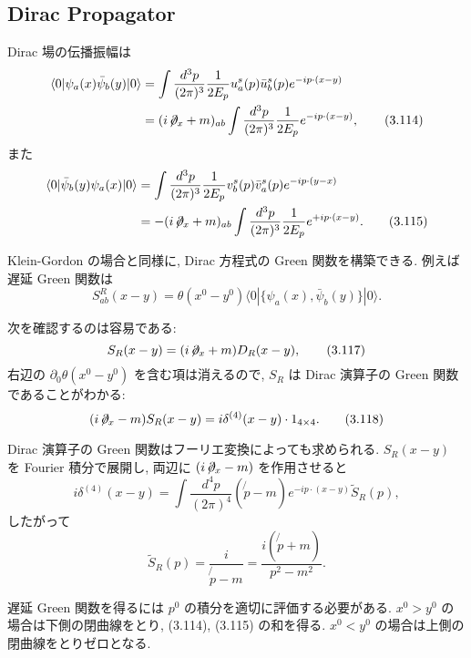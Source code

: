 \documentclass[a4paper,12pt]{article}
\begin{document}
\subsection*{Dirac Propagator}

Dirac 場の伝播振幅は
\begin{align}
\langle 0|\psi_a(x)\bar{\psi}_b(y)|0\rangle
&= \int \frac{d^3p}{(2\pi)^3}\frac{1}{2E_p} u_a^s(p)\bar{u}_b^s(p) e^{-ip\cdot(x-y)} \\
&= (i\!\not\!\partial_x+m)_{ab} \int \frac{d^3p}{(2\pi)^3}\frac{1}{2E_p} e^{-ip\cdot(x-y)} ,
\tag{3.114}
\end{align}
また
\begin{align}
\langle 0|\bar{\psi}_b(y)\psi_a(x)|0\rangle
&= \int \frac{d^3p}{(2\pi)^3}\frac{1}{2E_p} v_b^s(p)\bar{v}_a^s(p) e^{-ip\cdot(y-x)} \\
&= -(i\!\not\!\partial_x+m)_{ab} \int \frac{d^3p}{(2\pi)^3}\frac{1}{2E_p} e^{+ip\cdot(x-y)} .
\tag{3.115}
\end{align}

Klein-Gordon の場合と同様に, Dirac 方程式の Green 関数を構築できる.  
例えば遅延 Green 関数は
\begin{equation}
S^R_{ab}(x-y) = \theta(x^0-y^0)\langle 0|\{\psi_a(x), \bar{\psi}_b(y)\}|0\rangle .
\tag{3.116}
\end{equation}

次を確認するのは容易である:
\begin{equation}
S_R(x-y) = (i\!\not\!\partial_x + m) D_R(x-y),
\tag{3.117}
\end{equation}
右辺の $\partial_0 \theta(x^0-y^0)$ を含む項は消えるので, $S_R$ は Dirac 演算子の Green 関数であることがわかる:
\begin{equation}
(i\!\not\!\partial_x - m) S_R(x-y) = i \delta^{(4)}(x-y)\cdot 1_{4\times4}.
\tag{3.118}
\end{equation}

Dirac 演算子の Green 関数はフーリエ変換によっても求められる.  
$S_R(x-y)$ を Fourier 積分で展開し, 両辺に $(i\!\not\!\partial_x - m)$ を作用させると
\begin{equation}
i\delta^{(4)}(x-y) = \int \frac{d^4p}{(2\pi)^4} (\not{p}-m) e^{-ip\cdot(x-y)} \tilde{S}_R(p),
\tag{3.119}
\end{equation}
したがって
\begin{equation}
\tilde{S}_R(p) = \frac{i}{\not{p}-m} = \frac{i(\not{p}+m)}{p^2-m^2}.
\tag{3.120}
\end{equation}

遅延 Green 関数を得るには $p^0$ の積分を適切に評価する必要がある.  
$x^0>y^0$ の場合は下側の閉曲線をとり, (3.114), (3.115) の和を得る.  
$x^0<y^0$ の場合は上側の閉曲線をとりゼロとなる.
\end{document}
